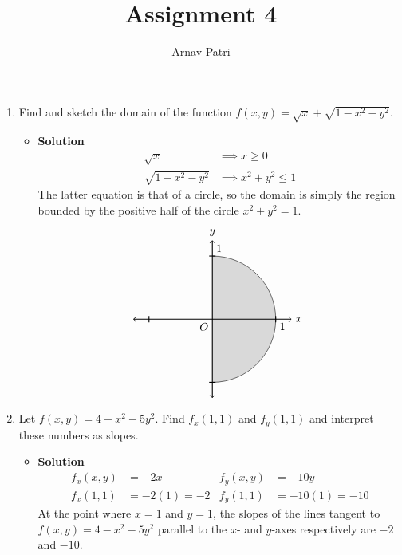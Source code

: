 \documentclass[12pt, A4]{article}
\title{Assignment 4}
\author{Arnav Patri}
\begin{document}
	\maketitle
		\begin{enumerate}[1)]
			\item
				Find and sketch the domain of the function $f(x, y) = \sqrt{x} + \sqrt{1 - x^2 - y^2}$.
				\begin{itemize}
					\item[] \textbf{Solution}
						\begin{align*}
							\sqrt{x} &\implies x \ge 0 \\
							\sqrt{1 - x^2 - y^2} &\implies x^2 + y^2 \le 1
						\end{align*}
						The latter equation is that of a circle, so the domain is simply the region bounded by the positive half of the circle $x^2 + y^2 = 1$.
						\[\begin{tikzpicture}[scale =2]
							\draw[fill = gray!30] (0, -1) arc[start angle = -90, end angle = 90, radius = 1cm];
							\draw[thick, <->] (-1.25, 0) -- (1.25, 0) node[anchor = west]{$x$};
							\draw[thick, <->] (0, -1.25) -- (0, 1.25) node[anchor = south]{$y$};
							\node at (0, 0) [anchor = north east] {$O$};
							\foreach \x in {-1, 1}
								\draw[thick] (\x, -0.05) -- (\x, 0.05);
							\foreach \y in {-1, 1}
								\draw[thick] (-0.05, \y) -- (0.05, \y);
							\node at (1, 0) [anchor = north west]{1};
							\node at (0, 1) [anchor = south west]{1};
						\end{tikzpicture}\]
				\end{itemize}
			\item
				Let $f(x, y) = 4 - x^2 - 5y^2$. Find $f_x(1, 1)$ and $f_y(1, 1)$ and interpret these numbers as slopes.
				\begin{itemize}
					\item[] \textbf{Solution}
						\begin{align*}
							f_x(x, y) &= -2x &
									f_y(x, y) &= -10y \\
							f_x(1, 1) &= -2(1) = -2 &
									f_y(1, 1) &= -10(1) = -10
						\end{align*}
						At the point where $x = 1$ and $y = 1$, the slopes of the lines tangent to $f(x, y) = 4 - x^2 - 5y^2$ parallel to the $x$- and $y$-axes respectively are $-2$ and $-10$.
				\end{itemize}


\end{enumerate}
\end{document}
